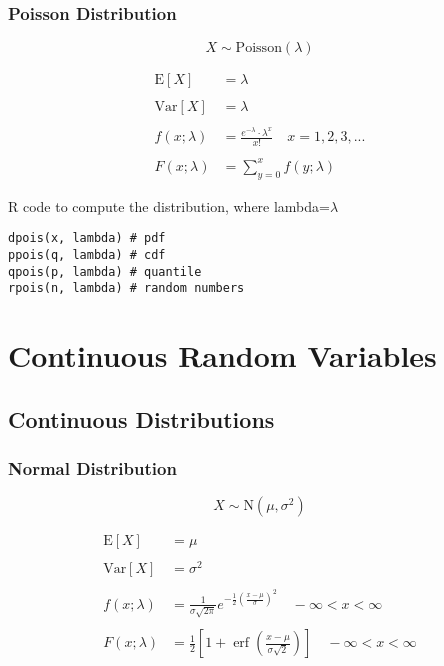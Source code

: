 \documentclass{article}
\begin{document}
\subsubsection*{Poisson Distribution}

$$ X \sim \mathrm{Poisson}(\lambda) $$

\begin{align*}
    \mathrm{E}[X] &= \lambda \\ \\
    \mathrm{Var}[X] &= \lambda \\ \\
    f(x; \lambda) &= \frac{e^{-\lambda} \cdot \lambda^x}{x!} \quad x = 1, 2, 3, ...\\ \\
    F(x; \lambda) &= \sum_{y=0}^{x} f(y; \lambda)
\end{align*}

R code to compute the distribution, where lambda=$\lambda$
\begin{lstlisting}
dpois(x, lambda) # pdf
ppois(q, lambda) # cdf
qpois(p, lambda) # quantile
rpois(n, lambda) # random numbers
\end{lstlisting}

\section*{Continuous Random Variables}

\subsection*{Continuous Distributions}

\subsubsection*{Normal Distribution}
$$ X \sim \mathrm{N}(\mu, \sigma^2)$$

\begin{align*}
    \mathrm{E}[X] &= \mu \\ \\
    \mathrm{Var}[X] &= \sigma^2 \\ \\
    f(x; \lambda) &= \frac{1}{\sigma \sqrt{2\pi} } e^{-\frac{1}{2}\left(\frac{x-\mu}{\sigma}\right)^2} \quad - \infty < x < \infty\\ \\
    F(x; \lambda) &= \frac{1}{2} \left[1 + \operatorname{erf}\left(\frac{x-\mu}{\sigma \sqrt 2 }\right)\right]  \quad - \infty < x < \infty
\end{align*}
\end{document}

